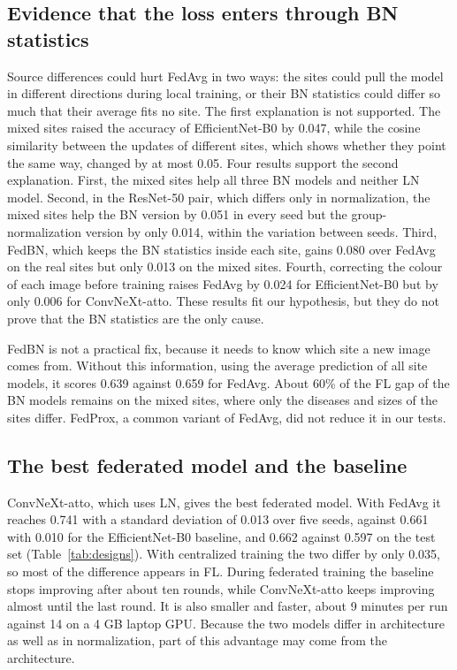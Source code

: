 \documentclass[10pt,twocolumn,a4paper]{article}
\begin{document}
\subsection{Evidence that the loss enters through BN statistics}
Source differences could hurt FedAvg in two ways: the sites could pull the model in different directions during local training, or their BN statistics could differ so much that their average fits no site. The first explanation is not supported. The mixed sites raised the accuracy of EfficientNet-B0 by 0.047, while the cosine similarity between the updates of different sites, which shows whether they point the same way, changed by at most 0.05. Four results support the second explanation. First, the mixed sites help all three BN models and neither LN model. Second, in the ResNet-50 pair, which differs only in normalization, the mixed sites help the BN version by 0.051 in every seed but the group-normalization version by only 0.014, within the variation between seeds. Third, FedBN, which keeps the BN statistics inside each site, gains 0.080 over FedAvg on the real sites but only 0.013 on the mixed sites. Fourth, correcting the colour of each image before training raises FedAvg by 0.024 for EfficientNet-B0 but by only 0.006 for ConvNeXt-atto. These results fit our hypothesis, but they do not prove that the BN statistics are the only cause.

FedBN is not a practical fix, because it needs to know which site a new image comes from. Without this information, using the average prediction of all site models, it scores 0.639 against 0.659 for FedAvg. About 60\% of the FL gap of the BN models remains on the mixed sites, where only the diseases and sizes of the sites differ. FedProx, a common variant of FedAvg, did not reduce it in our tests.

\subsection{The best federated model and the baseline}\label{sec:best}
ConvNeXt-atto, which uses LN, gives the best federated model. With FedAvg it reaches 0.741 with a standard deviation of 0.013 over five seeds, against 0.661 with 0.010 for the EfficientNet-B0 baseline, and 0.662 against 0.597 on the test set (Table~\ref{tab:designs}). With centralized training the two differ by only 0.035, so most of the difference appears in FL. During federated training the baseline stops improving after about ten rounds, while ConvNeXt-atto keeps improving almost until the last round. It is also smaller and faster, about 9 minutes per run against 14 on a 4 GB laptop GPU. Because the two models differ in architecture as well as in normalization, part of this advantage may come from the architecture.
\end{document}
